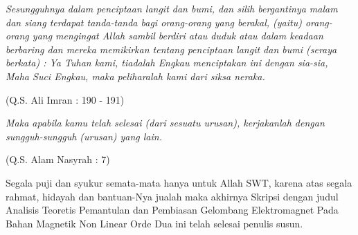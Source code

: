 \documentclass[skrips,inggris]{ugmskripsi}
\begin{document}
\cover

\titlepageind 

\approvalpage

\declarepage

\acknowledment
\begin{flushright}
\Large\emph{}
\end{flushright}

\motto
\emph{Sesungguhnya dalam penciptaan langit dan bumi, dan silih bergantinya
malam dan siang terdapat tanda-tanda bagi orang-orang yang berakal, (yaitu)
orang-orang yang mengingat Allah sambil berdiri atau duduk atau dalam keadaan
berbaring dan mereka memikirkan tentang penciptaan langit dan bumi (seraya
berkata) : Ya Tuhan kami, tiadalah Engkau menciptakan ini dengan sia-sia, Maha
Suci Engkau, maka peliharalah kami dari siksa neraka.}

\begin{flushright}
(Q.S. Ali Imran : 190 - 191)
\end{flushright}

\emph{Maka apabila kamu telah selesai (dari sesuatu urusan), kerjakanlah
dengan sungguh-sungguh (urusan) yang lain.}

\begin{flushright}
(Q.S. Alam Nasyrah : 7)
\end{flushright}

\preface
Segala puji dan syukur semata-mata hanya untuk Allah SWT, karena atas segala
rahmat, hidayah dan bantuan-Nya jualah maka akhirnya Skripsi dengan judul
Analisis Teoretis Pemantulan dan Pembiasan Gelombang Elektromagnet Pada
Bahan Magnetik Non Linear Orde Dua ini telah selesai penulis susun.
\end{document}

